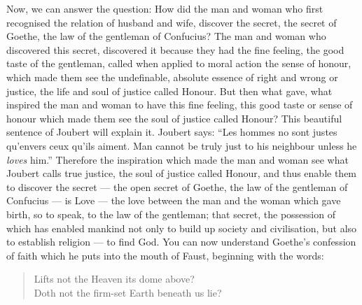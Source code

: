 Now, we can answer the question: How did the man and woman who first recognised the relation of husband and wife, discover the secret, the secret of Goethe, the law of the gentleman of Confucius?
The man and woman who discovered this secret, discovered it because they had the fine feeling, the good taste of the gentleman, called when applied to moral action the sense of honour, which made them see the undefinable, absolute essence of right and wrong or justice, the life and soul of justice called Honour.
But then what gave, what inspired the man and woman to have this fine feeling, this good taste or sense of honour which made them see the soul of justice called Honour?
This beautiful sentence of Joubert will explain it.
Joubert says: ``Les hommes no sont justes qu'envers ceux qu'ils aiment. Man cannot be truly just to his neighbour unless he \emph{loves} him.''
Therefore the inspiration which made the man and woman see what Joubert calls true justice, the soul of justice called Honour, and thus enable them to discover the secret --- the open secret of Goethe, the law of the gentleman of Confucius --- is Love --- the love between the man and the woman which gave birth, so to speak, to the law of the gentleman; that secret, the possession of which has enabled mankind not only to build up society and civilisation, but also to establish religion --- to find God.
You can now understand Goethe's confession of faith which he puts into the mouth of Faust, beginning with the words:
\begin{quote}\footnotesize
    Lifts not the Heaven its dome above? \\
    Doth not the firm-set Earth beneath us lie?
\end{quote}

